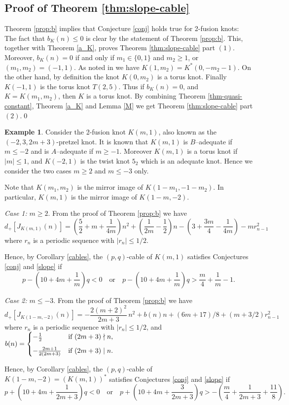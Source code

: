 \documentclass[11pt]{amsart}
\numberwithin{equation}{section}
\theoremstyle{plain}
\theoremstyle{definition}
\newtheorem{example}[theorem]{Example}
\begin{document}
\subsection{Proof of Theorem \ref{thm:slope-cable}} 
Theorem \ref{prop:b} implies that Conjecture \ref{conj} holds true for 2-fusion knots: The fact that $b_K(n)\leq 0$ is clear by the statement
of Theorem \ref{prop:b}.  This, together with Theorem \ref{a_K}, proves Theorem \ref{thm:slope-cable} part $(1)$.
Moreover, $b_K(n) = 0$ if and only if $m_1 \in \{0,1\}$ and $m_2 \ge 1$, or $(m_1, m_2) = (-1,1)$.
As noted in \cite{GV}  we have
$K(1, m_2)= K^*(0, -m_2-1)$. On the other hand, by definition 
the knot $K(0, m_2)$ is a torus  knot. Finally  $K(-1, 1)$ is the torus knot $T(2,5)$.
Thus if $b_K(n)=0$, and $K=K(m_1, m_2)$, then $K$ is a torus knot.
By combining Theorem \ref{thm-quasi-constant}, Theorem \ref{a_K} and Lemma \ref{M} we get Theorem \ref{thm:slope-cable} part $(2)$.\qed
 
\begin{example} 
Consider the 2-fusion knot $K(m, 1)$, also known as the $(-2,3,2m+3)$-pretzel knot. It is known that $K(m,1)$ is $B$--adequate if $m \le -2$ and is $A$--adequate if $m \ge -1$. Moreover $K(m,1)$ is a torus knot if $|m| \le 1$, and $K(-2,1)$ is the twist knot $5_2$ which is an adequate knot. Hence we consider the two cases $m \ge 2$ and $m \le -3$ only. 

Note that $K(m_1,m_2)$ is the mirror image of $K(1-m_1, -1-m_2)$. In particular, $K(m,1)$ is the mirror image of $K(1-m, -2)$.

\textit{Case 1:} $m \ge 2$. From the proof of Theorem \ref{prop:b} we have
$$
d_+[J_{K(m, 1)}(n)] = \left( \frac{5}{2} + m + \frac{1}{4m} \right) n^2 + \left( \frac{1}{2m} - \frac{1}{2} \right) n - \left( 3 + \frac{3m}{4} - \frac{1}{4m} \right) - m r^2_{n-1}
$$
where $r_n$ is a periodic sequence with $|r_n| \le 1/2$.

Hence, by Corollary \ref{cables}, the $(p,q)$-cable of $K(m,1)$ satisfies Conjectures \ref{conj} and \ref{slope} if $$p-\left( 10 + 4m + \frac{1}{m} \right)q <0 \quad \text{or} \quad p-\left( 10+ 4m + \frac{1}{m} \right)q > \frac{m}{4} + \frac{1}{m} - 1.$$

\textit{Case 2:} $m \le -3$. From the proof of Theorem \ref{prop:b} we have
$$d_+[J_{K(1-m, -2)}(n)] = -\frac {2(m+2)^2} {2m+3} \, n^2 + b(n) n + (6m+17)/8 + (m + 3/2) r^2_{n-1}$$
where $r_n$ is a periodic sequence with $|r_n| \le 1/2$, and $b(n) = \begin{cases} -\frac{1}{2}   &\mbox{if } (2m+3) \nmid n, \medskip \\ 
-\frac {2m+1} {2( 2m+3)} & \mbox{if } (2m+3) \mid n. \end{cases}$

\smallskip

Hence, by Corollary \ref{cables}, the $(p,q)$-cable of $K(1-m, -2) = (K(m,1))^*$ satisfies Conjectures \ref{conj} and \ref{slope} if $$p + \left( 10 + 4m + \frac{1}{2m + 3} \right)q < 0 \quad \text{or} \quad p + \left( 10+ 4m + \frac{3}{2m+3} \right)q > - \left( \frac{m}{4} + \frac{1}{2m+3}+ \frac{11}{8} \right).$$
\end{example}
\end{document}
